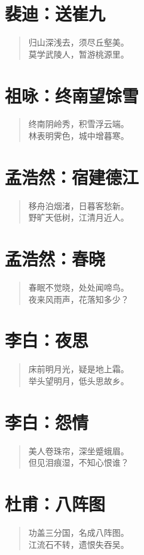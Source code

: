 \documentclass[12pt,oneside]{book}
\newenvironment{shici}{%
\begin{verse}\centering\yanti\large\hspace{12pt}}{\end{verse}}
\begin{document}
\begin{common-format}
\chapter{裴迪：送崔九}
\begin{shici}
归山深浅去，须尽丘壑美。\\
莫学武陵人，暂游桃源里。
\end{shici}

\chapter{祖咏：终南望馀雪}
\begin{shici}
终南阴岭秀，积雪浮云端。\\
林表明霁色，城中增暮寒。
\end{shici}

\chapter{孟浩然：宿建德江}
\begin{shici}
移舟泊烟渚，日暮客愁新。\\
野旷天低树，江清月近人。
\end{shici}

\chapter{孟浩然：春晓}
\begin{shici}
春眠不觉晓，处处闻啼鸟。\\
夜来风雨声，花落知多少？
\end{shici}

\chapter{李白：夜思}
\begin{shici}
床前明月光，疑是地上霜。\\
举头望明月，低头思故乡。
\end{shici}

\chapter{李白：怨情}
\begin{shici}
美人卷珠帘，深坐蹙蛾眉。\\
但见泪痕湿，不知心恨谁？
\end{shici}

\chapter{杜甫：八阵图}
\begin{shici}
功盖三分国，名成八阵图。\\
江流石不转，遗恨失吞吴。
\end{shici}


\end{common-format}
\end{document}
